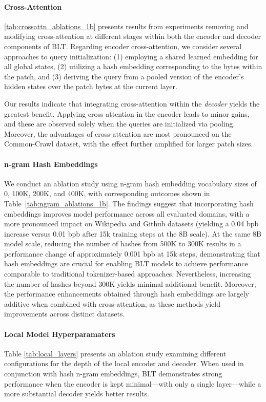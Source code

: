 \paragraph{Cross-Attention} 
\autoref{tab:crossattn_ablations_1b} presents results from experiments removing and modifying cross-attention at different stages within both the encoder and decoder components of {\textsc BLT}. Regarding encoder cross-attention, we consider several approaches to query initialization: (1) employing a shared learned embedding for all global states, (2) utilizing a hash embedding corresponding to the bytes within the patch, and (3) deriving the query from a pooled version of the encoder's hidden states over the patch bytes at the current layer.

Our results indicate that integrating cross-attention within the \textit{decoder} yields the greatest benefit. Applying cross-attention in the encoder leads to minor gains, and these are observed solely when the queries are initialized via pooling. Moreover, the advantages of cross-attention are most pronounced on the Common-Crawl dataset, with the effect further amplified for larger patch sizes.

\paragraph{n-gram Hash Embeddings} 

We conduct an ablation study using n-gram hash embedding vocabulary sizes of 0, 100K, 200K, and 400K, with corresponding outcomes shown in Table~\ref{tab:ngram_ablations_1b}. The findings suggest that incorporating hash embeddings improves model performance across all evaluated domains, with a more pronounced impact on Wikipedia and Github datasets (yielding a 0.04 bpb increase versus 0.01 bpb after 15k training steps at the 8B scale). At the same 8B model scale, reducing the number of hashes from 500K to 300K results in a performance change of approximately 0.001 bpb at 15k steps, demonstrating that hash embeddings are crucial for enabling {\textsc BLT} models to achieve performance comparable to traditional tokenizer-based approaches. Nevertheless, increasing the number of hashes beyond 300K yields minimal additional benefit. Moreover, the performance enhancements obtained through hash embeddings are largely additive when combined with cross-attention, as these methods yield improvements across distinct datasets.

\paragraph{Local Model Hyperparamaters} Table \ref{tab:local_layers} presents an ablation study examining different configurations for the depth of the local encoder and decoder. When used in conjunction with hash n-gram embeddings, {\textsc BLT} demonstrates strong performance when the encoder is kept minimal—with only a single layer—while a more substantial decoder yields better results.

